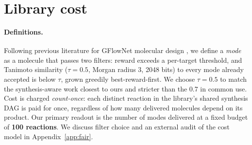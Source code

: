 \documentclass{article}
\newcommand{\pending}[1]{#1}
\begin{document}
%

\section{Library cost}
\label{sec:metric}

\paragraph{Definitions.}
Following previous literature for GFlowNet molecular design
\citep{bengio2021flow,zhang2023quantileflows,lau2024qgfn,shen2025cgflow}, we define a \emph{mode} as a molecule that passes two filters: reward exceeds a per-target threshold, and Tanimoto similarity ($\tau = 0.5$, Morgan radius 3, 2048 bits) to every mode already accepted is below $\tau$, grown greedily best-reward-first. We choose $\tau = 0.5$ to match the synthesis-aware work closest to ours \citep{shen2025cgflow} and stricter than the 0.7 in common use. Cost is charged \emph{count-once}: each distinct reaction in the library's shared synthesis DAG is paid for once, regardless of how many delivered molecules depend on its product. Our primary readout is the number of modes delivered at a fixed budget of \textbf{100 reactions}. We discuss filter choice and an external audit of the cost model in Appendix~\ref{app:fair}.
\end{document}
